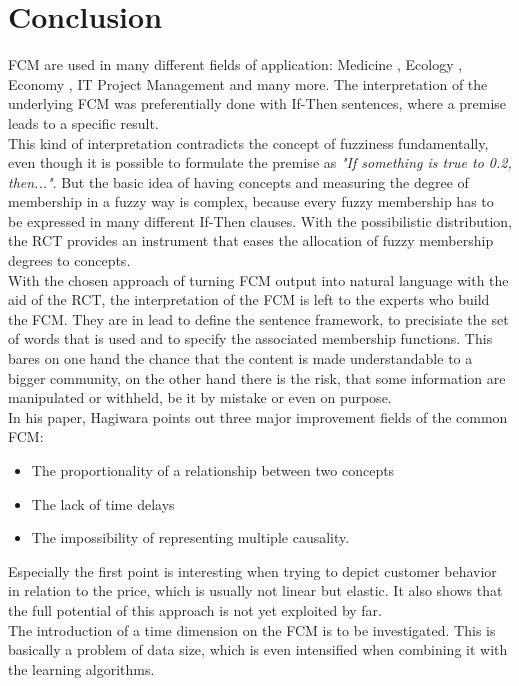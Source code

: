 \documentclass[conference]{IEEEtran}
\begin{document}
\section{Conclusion}
FCM are used in many different fields of application: Medicine \cite{georgopoulos2003}, Ecology \cite{ozesmi2004}, Economy \cite{carvalho2004}, IT Project Management \cite{rodriguez2007} and many more. The interpretation of the underlying FCM was preferentially done with If-Then sentences, where a premise leads to a specific result.\\
This kind of interpretation contradicts the concept of fuzziness fundamentally, even though it is possible to formulate the premise as \emph{"If something is true to 0.2, then..."}. But the basic idea of having concepts and measuring the degree of membership in a fuzzy way is complex, because every fuzzy membership has to be expressed in many different If-Then clauses. With the possibilistic distribution, the RCT provides an instrument that eases the allocation of fuzzy membership degrees to concepts.\\
With the chosen approach of turning FCM output into natural language with the aid of the RCT, the interpretation of the FCM is left to the experts who build the FCM. They are in lead to define the sentence framework, to precisiate the set of words that is used and to specify the associated membership functions. This bares on one hand the chance that the content is made understandable to a bigger community, on the other hand there is the risk, that some information are manipulated or withheld, be it by mistake or even on purpose.\\
In his paper, Hagiwara \cite{hagiwara1992} points out three major improvement fields of the common FCM: 
\begin{itemize}
\item The proportionality of a relationship between two concepts
\item The lack of time delays
\item The impossibility of representing multiple causality. 
\end{itemize}
Especially the first point is interesting when trying to depict customer behavior in relation to the price, which is usually not linear but elastic. It also shows that the full potential of this approach is not yet exploited by far.\\
The introduction of a time dimension on the FCM is to be investigated. This is basically a problem of data size, which is even intensified when combining it with the learning algorithms.\\
\end{document}
